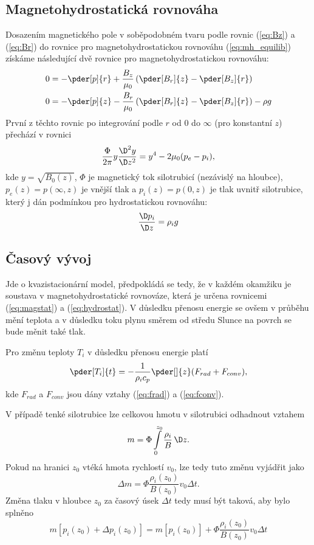 \subsection{Magnetohydrostatická rovnováha}
Dosazením magnetického pole v soběpodobném tvaru podle rovnic (\ref{eq:Bz}) a (\ref{eq:Br}) do rovnice pro magnetohydrostatickou rovnováhu (\ref{eq:mh_equilib}) získáme následující dvě rovnice pro magnetohydrostatickou rovnováhu:
\begin{align}
	0 &= -\pder[p]{r}+\frac{B_z}{\mu_0}\left(\pder[B_r]{z}-\pder[B_z]{r}\right)\\
	0 &= -\pder[p]{z}-\frac{B_r}{\mu_0}\left(\pder[B_r]{z}-\pder[B_z]{r}\right)-\rho g
\end{align}
První z těchto rovnic po integrování podle $r$ od $0$ do $\infty$ (pro konstantní $z$) přechází v rovnici
\begin{equation}
	\frac{\Phi}{2\pi}y\frac{\D^2y}{\D z^2}=y^4-2\mu_0(p_e-p_i), \label{eq:magstat}
\end{equation}
kde $y=\sqrt{B_0(z)}$, $\Phi$ je magnetický tok silotrubicí (nezávislý na hloubce), $p_e(z)=p(\infty,z)$ je vnější tlak a $p_i(z)=p(0,z)$ je tlak uvnitř silotrubice, který j dán podmínkou pro hydrostatickou rovnováhu:
\begin{equation}
	\frac{\D p_i}{\D z}=\rho_i g \label{eq:hydrostat}
\end{equation}

\subsection{Časový vývoj}
Jde o kvazistacionární model, předpokládá se tedy, že v každém okamžiku je soustava v magnetohydrostatické rovnováze, která je určena rovnicemi (\ref{eq:magstat}) a (\ref{eq:hydrostat}). V důsledku přenosu energie se ovšem v průběhu mění teplota a v důsledku toku plynu směrem od středu Slunce na povrch se bude měnit také tlak.

Pro změnu teploty $T_i$ v důsledku přenosu energie platí
\begin{equation}
	\pder[T_i]{t}=-\frac{1}{\rho_i c_p} \pder[]{z}(F_{rad}+F_{conv}),
\end{equation}
kde $F_{rad}$ a $F_{conv}$ jsou dány vztahy (\ref{eq:frad}) a (\ref{eq:fconv}).

V případě tenké silotrubice lze celkovou hmotu v silotrubici odhadnout vztahem
\begin{equation}
	m = \Phi\int\limits_0^{z_0}\frac{\rho_i}{B}\,\D z.
\end{equation}
Pokud na hranici $z_0$ vtéká hmota rychlostí $v_0$, lze tedy tuto změnu vyjádřit jako
\begin{equation}
	\Delta m=\Phi\frac{\rho_i(z_0)}{B(z_0)}v_0\Delta t.
\end{equation}
Změna tlaku v hloubce $z_0$ za časový úsek $\Delta t$ tedy musí být taková, aby bylo splněno
\begin{equation}
	m[p_i(z_0)+\Delta p_i(z_0)]=m[p_i(z_0)]+\Phi\frac{\rho_i(z_0)}{B(z_0)}v_0\Delta t
\end{equation}